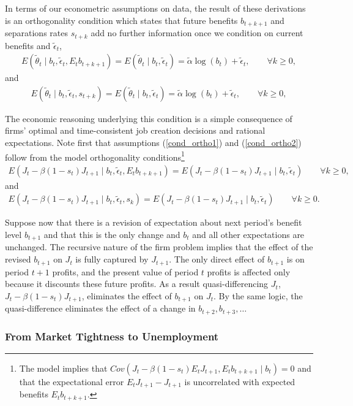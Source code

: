 \documentclass[12pt]{article}
\newcommand{\1}{\mathbf{1}}
\newcommand{\beq}{\begin{eqnarray}}
\newcommand{\eeq}{\end{eqnarray}}
\begin{document}
In terms of our econometric assumptions on data, the result of these derivations is an orthogonality condition which states that future benefits $b_{t+k+1}$ and separations rates $s_{t+k}$ add no further information once we condition on current benefits and $\tilde{\epsilon}_t$,
\beq
E( \tilde{\theta}_t \mid b_t,  \tilde{\epsilon}_t, E_t b_{t+k+1} ) = E( \tilde{\theta}_t \mid b_t,  \tilde{\epsilon}_t)  = \tilde{\alpha} \log(b_t) + \tilde{\epsilon}_t, \qquad \forall k \geq 0,  \label{cond_ortho1}
\eeq
and
\beq
E( \tilde{\theta}_t \mid b_t,  \tilde{\epsilon}_t, s_{t+k} ) = E( \tilde{\theta}_t \mid b_t,  \tilde{\epsilon}_t) = \tilde{\alpha} \log(b_t) + \tilde{\epsilon}_t, \qquad \forall k \geq 0,  \label{cond_ortho2}
\eeq



 The economic reasoning underlying this condition is a simple consequence of firms' optimal and time-consistent job creation decisions and rational expectations. Note first that assumptions (\ref{cond_ortho1}) and (\ref{cond_ortho2}) follow from 
 the model orthogonality conditions\footnote{The model implies that $Cov ( J_t - \beta(1-s_t) E_t J_{t+1}, E_t b_{t+k+1} \mid b_t) = 0$ and that the expectational error $E_t J_{t+1} - J_{t+1}$ is uncorrelated with expected benefits $E_t b_{t+k+1}$.}
\beq
E( J_t - \beta(1-s_t) J_{t+1} \mid b_t,  \tilde{\epsilon}_t, E_t b_{t+k+1} ) = E( J_t - \beta(1-s_t) J_{t+1} \mid b_t,  \tilde{\epsilon}_t)  \qquad \forall k \geq 0,  
\eeq
and
\beq
E( J_t - \beta(1-s_t) J_{t+1} \mid b_t,  \tilde{\epsilon}_t, s_k ) = E( J_t - \beta(1-s_t) J_{t+1} \mid b_t,  \tilde{\epsilon}_t)\qquad \forall k \geq 0.
\eeq

 
 Suppose now that there is a revision of expectation about next period's benefit level $b_{t+1}$ and that this is the only change and $b_t$ and all other expectations are unchanged. The recursive nature of the firm problem implies that the effect of the revised $b_{t+1}$ on $J_t$ is fully captured by $J_{t+1}$. The only direct effect of $b_{t+1}$ is on period $t+1$ profits, and the present value of period $t$ profits is affected only because it discounts these future profits. As a result quasi-differencing $J_t$, $J_t - \beta(1-s_t) J_{t+1}$, eliminates the effect of $b_{t+1}$ on $J_t$. By the same logic, the quasi-difference eliminates the effect of a change in $b_{t+2}, b_{t+3}, \ldots$
 
 

\subsubsection{ \hspace{-.4cm} From Market Tightness to Unemployment}
\end{document}
